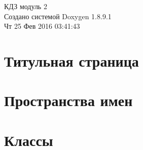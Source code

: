 \documentclass[twoside]{article}
\newcommand{\+}{\discretionary{\mbox{\scriptsize$\hookleftarrow$}}{}{}}
\newcommand{\clearemptydoublepage}{%
  \newpage{\pagestyle{empty}\cleardoublepage}%
}
\begin{document}
\begin{titlepage}
\vspace*{7cm}
\begin{center}%
{\Large КДЗ модуль 2 }\\
\vspace*{1cm}
{\large Создано системой Doxygen 1.8.9.1}\\
\vspace*{0.5cm}
{\small Чт 25 Фев 2016 03:41:43}\\
\end{center}
\end{titlepage}
\tableofcontents
{}

\section{Титульная страница}
\label{index}
\section{Пространства имен}


\section{Классы}















\newpage
{}
\clearemptydoublepage
{}
\printindex
\end{document}
